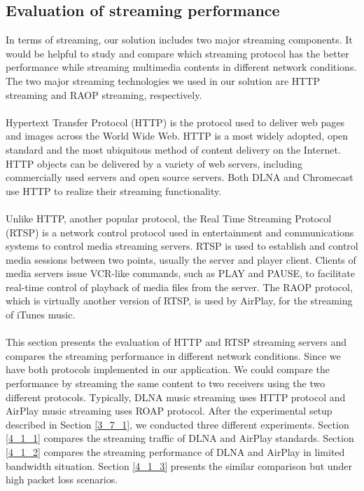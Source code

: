\subsection{Evaluation of streaming performance\label{4_1}}
In terms of streaming, our solution includes two major streaming components. It
would be helpful to study and compare which streaming protocol has the better
performance while streaming multimedia contents in different network conditions.
The two major streaming technologies we used in our solution are HTTP streaming
and RAOP streaming, respectively.\\
\\
Hypertext Transfer Protocol (HTTP) is the protocol used to deliver web pages
and images across the World Wide Web. HTTP is a most widely adopted, open
standard and the most ubiquitous method of content delivery on the Internet.
HTTP objects can be delivered by a variety of web servers, including
commercially used servers and open source servers. Both DLNA and Chromecast use
HTTP to realize their streaming functionality.\\
\\
Unlike HTTP, another popular protocol, the Real Time Streaming Protocol (RTSP)
is a network control protocol used in entertainment and communications systems
to control media streaming servers. RTSP is used to establish and control media
sessions between two points, usually the server and player client. Clients of
media servers issue VCR-like commands, such as PLAY and PAUSE, to facilitate
real-time control of playback of media files from the server.  The RAOP
protocol, which is virtually another version of RTSP, is used by AirPlay, for
the streaming of iTunes music.\\
\\
This section presents the evaluation of HTTP and RTSP streaming servers and compares the streaming performance in different network conditions. Since we have both protocols implemented in our application. We could compare the performance by streaming the same content to two receivers using the two different protocols. Typically, DLNA music streaming uses HTTP protocol and AirPlay music streaming uses ROAP protocol. After the experimental setup described in Section \ref{3_7_1}, we conducted three different experiments. Section \ref{4_1_1} compares the streaming traffic of DLNA and AirPlay standards. Section \ref{4_1_2} compares the streaming performance of DLNA and AirPlay in limited bandwidth situation. Section \ref{4_1_3} presents the similar comparison but under high packet loss scenarios.
